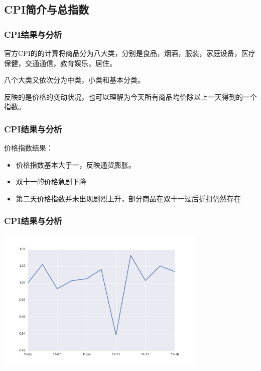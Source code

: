 \documentclass{beamer}
\begin{document}
\subsection{CPI简介与总指数}
\begin{frame}
\frametitle{CPI结果与分析}
官方CPI的的计算将商品分为八大类，分别是食品，烟酒，服装，家庭设备，医疗保健，交通通信，教育娱乐，居住。

八个大类又依次分为中类，小类和基本分类。

反映的是价格的变动状况，也可以理解为今天所有商品均价除以上一天得到的一个指数。
\end{frame}
\begin{frame}
\frametitle{CPI结果与分析}
价格指数结果：
\begin{itemize}
  \item 价格指数基本大于一，反映通货膨胀。
  \item 双十一的价格急剧下降
  \item 第二天价格指数并未出现剧烈上升，部分商品在双十一过后折扣仍然存在
\end{itemize}
\end{frame}
\begin{frame}
\frametitle{CPI结果与分析}
\includegraphics[width=10cm,height=7cm]{double11_totalindex.png}
\end{frame}
\end{document}
